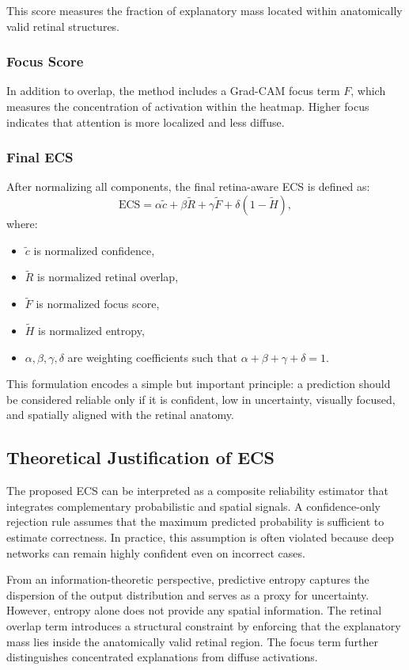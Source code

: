 \documentclass[conference]{IEEEtran}
\begin{document}
This score measures the fraction of explanatory mass located within anatomically valid retinal structures.

\subsubsection{Focus Score}
In addition to overlap, the method includes a Grad-CAM focus term $F$, which measures the concentration of activation within the heatmap. Higher focus indicates that attention is more localized and less diffuse.

\subsubsection{Final ECS}
After normalizing all components, the final retina-aware ECS is defined as:
\begin{equation}
\text{ECS} = \alpha \tilde{c} + \beta \tilde{R} + \gamma \tilde{F} + \delta (1 - \tilde{H}),
\end{equation}
where:
\begin{itemize}
    \item $\tilde{c}$ is normalized confidence,
    \item $\tilde{R}$ is normalized retinal overlap,
    \item $\tilde{F}$ is normalized focus score,
    \item $\tilde{H}$ is normalized entropy,
    \item $\alpha,\beta,\gamma,\delta$ are weighting coefficients such that $\alpha+\beta+\gamma+\delta=1$.
\end{itemize}

This formulation encodes a simple but important principle: a prediction should be considered reliable only if it is confident, low in uncertainty, visually focused, and spatially aligned with the retinal anatomy.

\subsection{Theoretical Justification of ECS}
The proposed ECS can be interpreted as a composite reliability estimator that integrates complementary probabilistic and spatial signals. A confidence-only rejection rule assumes that the maximum predicted probability is sufficient to estimate correctness. In practice, this assumption is often violated because deep networks can remain highly confident even on incorrect cases.

From an information-theoretic perspective, predictive entropy captures the dispersion of the output distribution and serves as a proxy for uncertainty. However, entropy alone does not provide any spatial information. The retinal overlap term introduces a structural constraint by enforcing that the explanatory mass lies inside the anatomically valid retinal region. The focus term further distinguishes concentrated explanations from diffuse activations.
\end{document}
